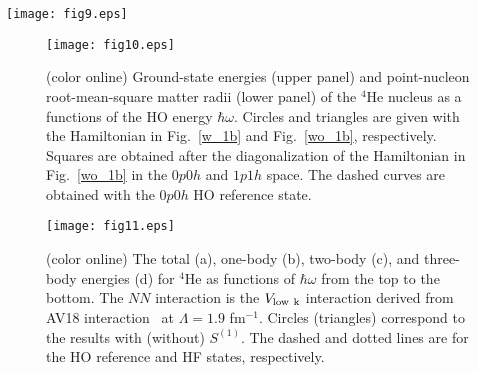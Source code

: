 \documentclass[aps,prc, dvips, twocolumn,groupedaddress,showkeys,showpacs,floatfix,superscriptaddress]{revtex4-1}
\newcommand{\<}{\langle}
\renewcommand{\>}{\rangle}
\begin{document}
\begin{figure*}[t!]
\texttt{[image: fig9.eps]}
\caption{\label{4He_conv_vlowk} (color online) Ground-state energies (upper panels; (a) and (b)) and
  point-nucleon root-mean-square matter radii (lower panels; (b) and (d)) of the $^{4}$He nucleus
 as a functions of the HO energy $\hbar\omega$.
 In (a) and (c), one-body correlations are approximately taken into account through the
 diagonalization in 0$p$0$h$ and 1$p$1$h$
 space as done in earlier works~\cite{Fujii:2004, Fujii:2009, Miyagi:2014, Miyagi:2015}.
 In (b) and (d), one-body correlations are explicitly included.
Note that the results from ``FY'' (solid line) and ``CCSD'' are taken from
Refs.~\cite{Nogga:2004} and~\cite{Hagen:2007}, respectively.}
\end{figure*}

\begin{figure}[t!]
\texttt{[image: fig10.eps]}
\caption{\label{4He_emax_1b_vlowk} (color online) Ground-state energies (upper panel) and
 point-nucleon root-mean-square matter radii (lower panel) of the $^{4}$He nucleus
 as a functions of the HO energy $\hbar\omega$.
Circles and triangles are given with the Hamiltonian in Fig.~\ref{w_1b} and
 Fig.~\ref{wo_1b}, respectively.
Squares are obtained after the diagonalization
 of the Hamiltonian in Fig.~\ref{wo_1b} in the $0p0h$ and $1p1h$ space.
The dashed curves are obtained with the $0p0h$ HO reference state.}
\end{figure}

\begin{figure}[t!]
\texttt{[image: fig11.eps]}
\caption{\label{T_U} (color online) The total (a), one-body (b), two-body (c), and three-body energies (d)
for $^{4}$He as functions of $\hbar\omega$ from the top to the bottom.
The $NN$ interaction is the $V_{\rm low \ k}$ interaction
   derived from AV18 interaction~\cite{Wiringa:1995} at $\Lambda = 1.9$ fm$^{-1}$.
Circles (triangles) correspond to the results with (without) $S^{(1)}$.
The dashed and dotted lines are for the HO reference and HF states, respectively.}
\end{figure}
\end{document}
